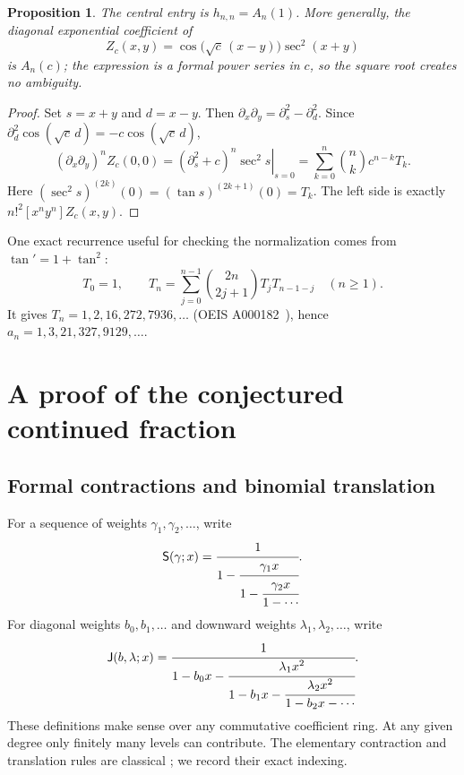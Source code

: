 \documentclass[11pt]{article}
\newtheorem{proposition}[theorem]{Proposition}
\theoremstyle{definition}
\theoremstyle{remark}
\newcommand{\Sfrac}{\mathsf S}
\newcommand{\Jfrac}{\mathsf J}
\begin{document}
\begin{proposition}\label{pou:prop:central}
The central entry is $h_{n,n}=A_n(1)$.  More generally, the diagonal
exponential coefficient of
\[
 Z_c(x,y)=\cos\bigl(\sqrt c\,(x-y)\bigr)\sec^2(x+y)
\]
is $A_n(c)$; the expression is a formal power series in $c$, so the square
root creates no ambiguity.
\end{proposition}
\begin{proof}
Set $s=x+y$ and $d=x-y$.  Then
$\partial_x\partial_y=\partial_s^2-\partial_d^2$.
Since $\partial_d^2\cos(\sqrt c\,d)=-c\cos(\sqrt c\,d)$,
\[
 (\partial_x\partial_y)^nZ_c(0,0)
 =\left.(\partial_s^2+c)^n\sec^2s\right|_{s=0}
 =\sum_{k=0}^n\binom nk c^{n-k}T_k.
\]
Here $(\sec^2s)^{(2k)}(0)=(\tan s)^{(2k+1)}(0)=T_k$.
The left side is exactly $n!^2[x^ny^n]Z_c(x,y)$.
\end{proof}

One exact recurrence useful for checking the normalization comes from
$\tan'=1+\tan^2$:
\begin{equation}\label{pou:eq:tangentrec}
 T_0=1,\qquad
 T_n=\sum_{j=0}^{n-1}\binom{2n}{2j+1}T_jT_{n-1-j}\quad(n\ge1).
\end{equation}
It gives $T_n=1,2,16,272,7936,\ldots$ (OEIS A000182~\cite{oeis182}), hence
$a_n=1,3,21,327,9129,\ldots$.

\section{A proof of the conjectured continued fraction}\label{pou:sec:cf}

\subsection{Formal contractions and binomial translation}

For a sequence of weights $\gamma_1,\gamma_2,\ldots$, write
\[
 \Sfrac(\gamma;x)=
 \cfrac1{1-\cfrac{\gamma_1x}{1-\cfrac{\gamma_2x}{1-\cdots}}}.
\]
For diagonal weights $b_0,b_1,\ldots$ and downward weights
$\lambda_1,\lambda_2,\ldots$, write
\[
 \Jfrac(b,\lambda;x)=
 \cfrac1{1-b_0x-\cfrac{\lambda_1x^2}
 {1-b_1x-\cfrac{\lambda_2x^2}{1-b_2x-\cdots}}}.
\]
These definitions make sense over any commutative coefficient ring.
At any given degree only finitely many levels can contribute.
The elementary contraction and translation rules are classical
\cite{bala}; we record their exact indexing.
\end{document}
